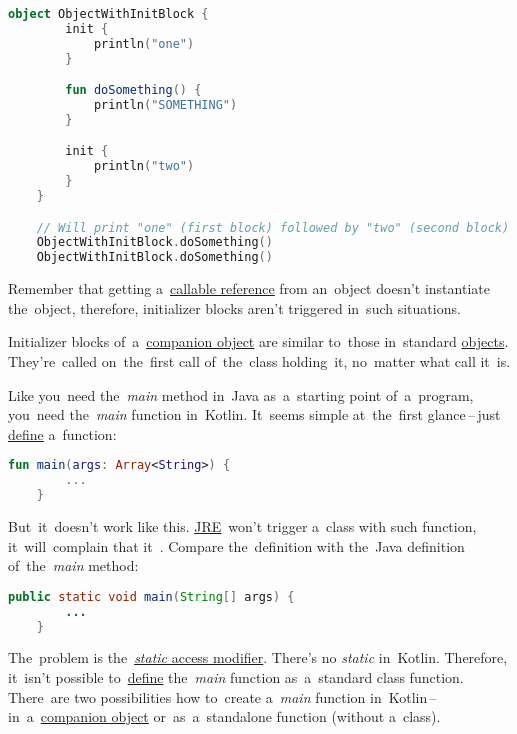 \begin{lstlisting}[language=Kotlin]
    object ObjectWithInitBlock {
        init {
            println("one")
        }

        fun doSomething() {
            println("SOMETHING")
        }

        init {
            println("two")
        }
    }

    // Will print "one" (first block) followed by "two" (second block) followed by "SOMETHING" twice (two calls of the function)
    ObjectWithInitBlock.doSomething()
    ObjectWithInitBlock.doSomething()
\end{lstlisting}

\warning Remember that getting a~\hyperref[kotlincallablereference]{callable reference} from an~object doesn't instantiate the~object, therefore, initializer blocks aren't triggered in~such situations.

Initializer blocks of~a~\hyperref[companionobject]{companion object} are similar to~those in~standard \hyperref[kotlinobject]{objects}.
They're~called on~the~first call of~the~class holding~it, no~matter what call it~is.

Like you~need the~\textit{main} method in~Java as~a~starting point of~a~program, you~need the~\textit{main} function in~Kotlin.
It~seems simple at~the~first glance\,--\,just \hyperref[declarationdefinition]{define} a~function:
\begin{lstlisting}[frame=no, language=Kotlin]
    fun main(args: Array<String>) {
        ...
    }
\end{lstlisting}

\noindent But~it~doesn't work like this.
\hyperref[jdkjrejvm]{JRE}~won't trigger a~class with such function, it~will~complain that it~.
Compare the~definition with the~Java definition of~the~\textit{main} method:
\begin{lstlisting}[frame=no, language=Java]
    public static void main(String[] args) {
        ...
    }
\end{lstlisting}

\noindent The~problem is the~\hyperref[javastatic]{\textit{static} access modifier}.
There's no \textit{static} in~Kotlin.
Therefore, it~isn't possible to~\hyperref[declarationdefinition]{define} the~\textit{main} function as~a~standard class function.
There~are two possibilities how to~create a~\textit{main} function in~Kotlin\,--\,in~a~\hyperref[companionobject]{companion object} or~as~a~standalone function (without a~class).

